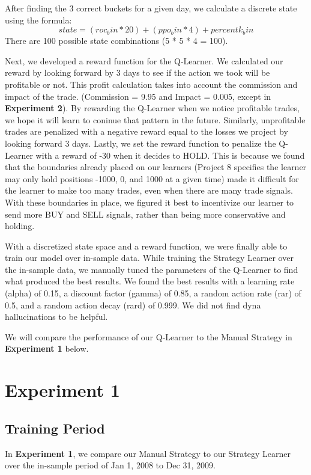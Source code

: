 \documentclass[
	letterpaper, %
]{jdf}
\begin{document}
After finding the 3 correct buckets for a given day, we calculate a discrete state using the formula: \[state = (roc_bin * 20) + (ppo_bin * 4) + percentk_bin \]
There are 100 possible state combinations (5 * 5 * 4 = 100).

Next, we developed a reward function for the Q-Learner.
We calculated our reward by looking forward by 3 days to see if the action we took will be profitable or not.
This profit calculation takes into account the commission and impact of the trade. 
(Commission = 9.95 and Impact = 0.005, except in \textbf{Experiment 2}).
By rewarding the Q-Learner when we notice profitable trades, we hope it will learn to coninue that pattern in the future.
Similarly, unprofitable trades are penalized with a negative reward equal to the losses we project by looking forward 3 days.
Lastly, we set the reward function to penalize the Q-Learner with a reward of -30 when it decides to HOLD.
This is because we found that the boundaries already placed on our learners (Project 8 specifies the learner may only hold positions -1000, 0, and 1000 at a given time) made it difficult for the learner to make too many trades, even when there are many trade signals.
With these boundaries in place, we figured it best to incentivize our learner to send more BUY and SELL signals, rather than being more conservative and holding.

With a discretized state space and a reward function, we were finally able to train our model over in-sample data.
While training the Strategy Learner over the in-sample data, we manually tuned the parameters of the Q-Learner to find what produced the best results.
We found the best results with a learning rate (alpha) of 0.15, a discount factor (gamma) of 0.85, a random action rate (rar) of 0.5, and a random action decay (rard) of 0.999.
We did not find dyna hallucinations to be helpful.

We will compare the performance of our Q-Learner to the Manual Strategy in \textbf{Experiment 1} below.

\section{Experiment 1}
\subsection{Training Period}
In \textbf{Experiment 1}, we compare our Manual Strategy to our Strategy Learner over the in-sample period of Jan 1, 2008 to Dec 31, 2009.
\end{document}
